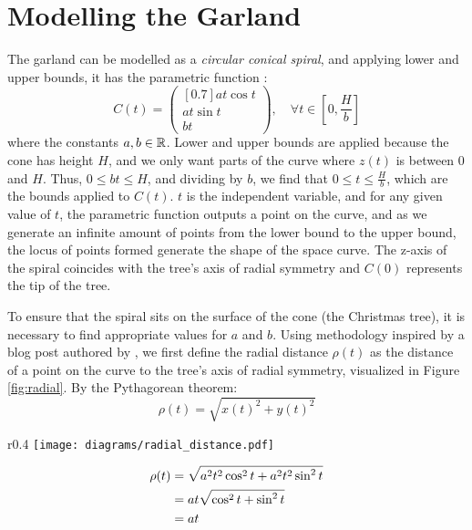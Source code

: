 \section{Modelling the Garland}

The garland can be modelled as a \emph{circular conical spiral}, and applying lower and upper bounds, it has the parametric function \autocite{rejbrandConicalHelix}:
\begin{equation}
    C(t) = \begin{pmatrix}[0.7]
        at\cos{t} \\
        at\sin{t} \\
        bt
    \end{pmatrix}, \quad \forall t \in \left[0, \frac{H}{b}\right]
\end{equation}
where the constants $a, b \in \mathbb{R}$. Lower and upper bounds are applied because the cone has height $H$, and we only want parts of the curve where $z(t)$ is between $0$ and $H$. Thus, $0 \leq bt \leq H$, and dividing by $b$, we find that $0 \leq t \leq \frac{H}{b}$, which are the bounds applied to $C(t)$. $t$ is the independent variable, and for any given value of $t$, the parametric function outputs a point on the curve, and as we generate an infinite
amount of points from the lower bound to the upper bound, the locus of points formed generate the shape of the space curve. The z-axis of the spiral coincides with the tree's axis of radial symmetry and $C(0)$ represents the tip of the tree.

To ensure that the spiral sits on the surface of the cone (the Christmas tree), it is necessary to find appropriate values for $a$ and $b$. Using methodology inspired by a blog post authored by \citeauthor{stewartGarland2014}, we first define the radial distance $\rho(t)$ as the distance of a point on the curve to the tree's axis of radial symmetry, visualized in Figure \ref{fig:radial}. By the Pythagorean theorem:
\begin{equation*}
    \rho(t) = \sqrt{x(t)^2+y(t)^2}
\end{equation*}

\begin{wrapfigure}{r}{0.4\textwidth}
    \centering
    \texttt{[image: diagrams/radial\_distance.pdf]}
    \caption{Radial distance of a point on the spiral to the z-axis (top-down view).} \label{fig:radial}
    \vspace*{-30pt}
\end{wrapfigure}
\begin{align}
    \rho(t) & = \sqrt{a^2t^2\cos^2{t}+a^2t^2\sin^2{t}} \notag \\
            & = at\sqrt{\cos^2{t}+\sin^2{t}} \notag           \\
            & = at
\end{align}


